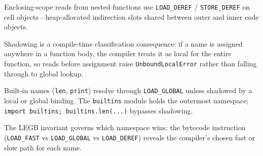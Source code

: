 Enclosing-scope reads from nested functions use \texttt{LOAD\_DEREF} / \texttt{STORE\_DEREF} on cell objects---heap-allocated indirection slots shared between outer and inner code objects.

Shadowing is a compile-time classification consequence: if a name is assigned anywhere in a function body, the compiler treats it as local for the entire function, so reads before assignment raise \texttt{UnboundLocalError} rather than falling through to global lookup.

Built-in names (\texttt{len}, \texttt{print}) resolve through \texttt{LOAD\_GLOBAL} unless shadowed by a local or global binding. The \texttt{builtins} module holds the outermost namespace; \texttt{import builtins; builtins.len(...)} bypasses shadowing.

The LEGB invariant governs which namespace wins; the bytecode instruction (\texttt{LOAD\_FAST} vs \texttt{LOAD\_GLOBAL} vs \texttt{LOAD\_DEREF}) reveals the compiler's chosen fast or slow path for each name.
